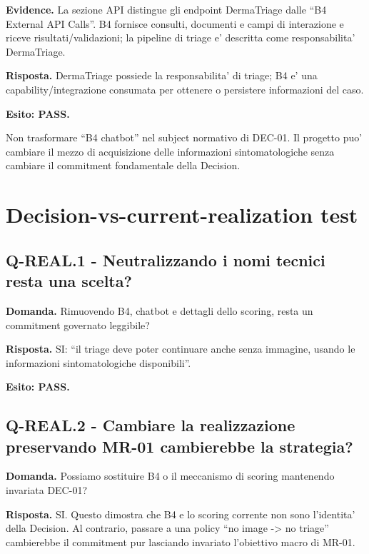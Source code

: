 \documentclass[11pt,a4paper]{article}
\begin{document}
\textbf{Evidence.} La sezione API distingue gli endpoint DermaTriage dalle ``B4 External API Calls''. B4 fornisce consulti, documenti e campi di interazione e riceve risultati/validazioni; la pipeline di triage e' descritta come responsabilita' DermaTriage.

\textbf{Risposta.} DermaTriage possiede la responsabilita' di triage; B4 e' una capability/integrazione consumata per ottenere o persistere informazioni del caso.

\textbf{Esito: PASS.}

\begin{ddtaworking}[title={Boundary preserved}]
Non trasformare ``B4 chatbot'' nel subject normativo di DEC-01. Il progetto puo' cambiare il mezzo di acquisizione delle informazioni sintomatologiche senza cambiare il commitment fondamentale della Decision.
\end{ddtaworking}

\section{Decision-vs-current-realization test}

\subsection{Q-REAL.1 - Neutralizzando i nomi tecnici resta una scelta?}
\begin{ddtacheck}
\textbf{Domanda.} Rimuovendo B4, chatbot e dettagli dello scoring, resta un commitment governato leggibile?
\end{ddtacheck}

\textbf{Risposta.} SI: ``il triage deve poter continuare anche senza immagine, usando le informazioni sintomatologiche disponibili''.

\textbf{Esito: PASS.}

\subsection{Q-REAL.2 - Cambiare la realizzazione preservando MR-01 cambierebbe la strategia?}
\begin{ddtacheck}
\textbf{Domanda.} Possiamo sostituire B4 o il meccanismo di scoring mantenendo invariata DEC-01?
\end{ddtacheck}

\textbf{Risposta.} SI. Questo dimostra che B4 e lo scoring corrente non sono l'identita' della Decision. Al contrario, passare a una policy ``no image -> no triage'' cambierebbe il commitment pur lasciando invariato l'obiettivo macro di MR-01.
\end{document}
